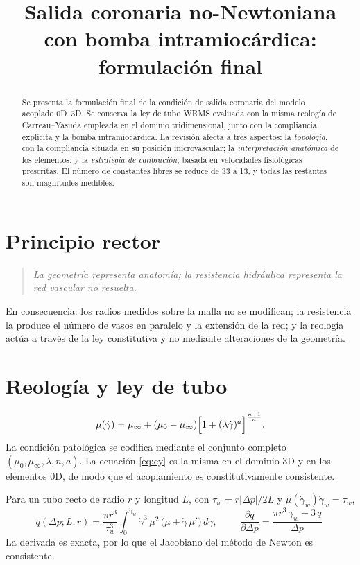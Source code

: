 \documentclass[11pt]{article}
\title{Salida coronaria no-Newtoniana con bomba intramioc\'ardica:\\
       formulaci\'on final}
\date{}
\newcommand{\dd}[2]{\frac{\partial #1}{\partial #2}}
\begin{document}
\maketitle

\begin{abstract}
\noindent
Se presenta la formulaci\'on final de la condici\'on de salida coronaria del
modelo acoplado 0D--3D. Se conserva la ley de tubo WRMS evaluada con la misma
reolog\'ia de Carreau--Yasuda empleada en el dominio tridimensional, junto con
la compliancia expl\'icita y la bomba intramioc\'ardica. La revisi\'on afecta a
tres aspectos: la \emph{topolog\'ia}, con la compliancia situada en su posici\'on
microvascular; la \emph{interpretaci\'on anat\'omica} de los elementos; y la
\emph{estrategia de calibraci\'on}, basada en velocidades fisiol\'ogicas
prescritas. El n\'umero de constantes libres se reduce de 33 a 13, y todas las
restantes son magnitudes medibles.
\end{abstract}

\section{Principio rector}

\begin{quote}
\emph{La geometr\'ia representa anatom\'ia; la resistencia hidr\'aulica
representa la red vascular no resuelta.}
\end{quote}
En consecuencia: los radios medidos sobre la malla no se modifican; la
resistencia la produce el n\'umero de vasos en paralelo y la extensi\'on de la
red; y la reolog\'ia act\'ua a trav\'es de la ley constitutiva y no mediante
alteraciones de la geometr\'ia.

\section{Reolog\'ia y ley de tubo}

\begin{equation}
  \mu(\dot\gamma)=\mu_\infty+(\mu_0-\mu_\infty)
  \Bigl[1+(\lambda\dot\gamma)^{a}\Bigr]^{\frac{n-1}{a}} .
  \label{eq:cy}
\end{equation}
La condici\'on patol\'ogica se codifica mediante el conjunto completo
$(\mu_0,\mu_\infty,\lambda,n,a)$. La ecuaci\'on \eqref{eq:cy} es la misma en el
dominio 3D y en los elementos 0D, de modo que el acoplamiento es
constitutivamente consistente.

Para un tubo recto de radio $r$ y longitud $L$, con $\tau_w=r|\Delta p|/2L$ y
$\mu(\dot\gamma_w)\dot\gamma_w=\tau_w$,
\begin{equation}
  q(\Delta p;L,r)=\frac{\pi r^3}{\tau_w^{3}}
  \int_{0}^{\dot\gamma_w}\!\dot\gamma^{3}\,\mu^2\,
  \bigl(\mu+\dot\gamma\,\mu'\bigr)\,d\dot\gamma ,
  \qquad
  \boxed{\;\dd{q}{\Delta p}=\frac{\pi r^3\,\dot\gamma_w-3\,q}{\Delta p}\;}
  \label{eq:wrms}
\end{equation}
La derivada es exacta, por lo que el Jacobiano del m\'etodo de Newton es
consistente.
\end{document}
